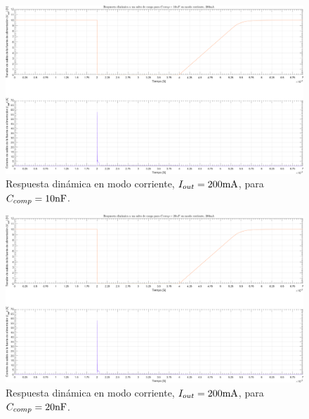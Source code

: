 \clearpage

\begin{figure}[H] %
\begin{center}
\includegraphics[width=1.1 \textwidth, angle=90]{./img/plots/dynamic/power_supply_CCOMP_10n_STEP_Modo4.png}
\caption{\label{fig:fig_power_supply_CCOMP_STEP_10n_Modo4}\footnotesize{Respuesta dinámica en modo corriente, $I_{out} = 200 \si[per-mode=symbol]{\milli\ampere}$, para $C_{comp} = 10 \si[per-mode=symbol]{\nano\farad} $.}}
\end{center}
\end{figure}

\clearpage

\begin{figure}[H] %
\begin{center}
\includegraphics[width=1.1 \textwidth, angle=90]{./img/plots/dynamic/power_supply_CCOMP_20n_STEP_Modo4.png}
\caption{\label{fig:fig_power_supply_CCOMP_STEP_20n_Modo4}\footnotesize{Respuesta dinámica en modo corriente, $I_{out} = 200 \si[per-mode=symbol]{\milli\ampere}$, para $C_{comp} = 20 \si[per-mode=symbol]{\nano\farad} $.}}
\end{center}
\end{figure}

\clearpage




